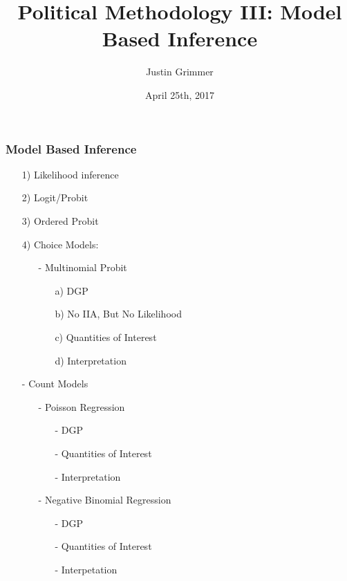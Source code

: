 \documentclass{beamer}
\title[Methodology III] %
{Political Methodology III: Model Based Inference}
\author{Justin Grimmer}
\institute[Stanford University]{Associate Professor\\Department of Political Science \\  Stanford University}
\date{April 25th, 2017}
\begin{document}
\begin{frame}
\titlepage
\end{frame}


\begin{frame}
\frametitle{Model Based Inference}

\begin{itemize}
\item[1)] Likelihood inference
\item[2)] Logit/Probit
\item[3)] Ordered Probit
\item[4)] Choice Models:
\begin{itemize}
\item[-] Multinomial Probit
\begin{itemize}
\item[a)] DGP
\item[b)] No IIA, But No Likelihood
\item[c)] Quantities of Interest
\item[d)] Interpretation
\end{itemize}
\end{itemize}
\item[-] Count Models
\begin{itemize}
\item[-] Poisson Regression
\begin{itemize}
\item[-] DGP
\item[-] Quantities of Interest
\item[-] Interpretation
\end{itemize}
\item[-] Negative Binomial Regression
\begin{itemize}
\item[-] DGP
\item[-] Quantities of Interest
\item[-] Interpetation
\end{itemize}
\end{itemize}
\end{itemize}

\end{frame}
\end{document}
